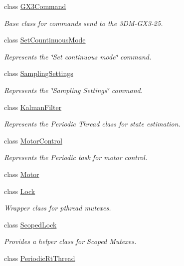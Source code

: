 \begin{DoxyCompactItemize}
class \hyperlink{class_u_s_u_1_1_g_x3_command}{\-G\-X3\-Command}
\begin{DoxyCompactList}\small\item\em \-Base class for commands send to the 3\-D\-M-\/\-G\-X3-\/25. \end{DoxyCompactList}\item 
class \hyperlink{class_u_s_u_1_1_set_countinuous_mode}{\-Set\-Countinuous\-Mode}
\begin{DoxyCompactList}\small\item\em \-Represents the \char`\"{}\-Set continuous mode\char`\"{} command. \end{DoxyCompactList}\item 
class \hyperlink{class_u_s_u_1_1_sampling_settings}{\-Sampling\-Settings}
\begin{DoxyCompactList}\small\item\em \-Represents the \char`\"{}\-Sampling Settings\char`\"{} command. \end{DoxyCompactList}\item 
class \hyperlink{class_u_s_u_1_1_kalman_filter}{\-Kalman\-Filter}
\begin{DoxyCompactList}\small\item\em \-Represents the \-Periodic \-Thread class for state estimation. \end{DoxyCompactList}\item 
class \hyperlink{class_u_s_u_1_1_motor_control}{\-Motor\-Control}
\begin{DoxyCompactList}\small\item\em \-Represents the \-Periodic task for motor control. \end{DoxyCompactList}\item 
class \hyperlink{class_u_s_u_1_1_motor}{\-Motor}
\item 
class \hyperlink{class_u_s_u_1_1_lock}{\-Lock}
\begin{DoxyCompactList}\small\item\em \-Wrapper class for pthread mutexes. \end{DoxyCompactList}\item 
class \hyperlink{class_u_s_u_1_1_scoped_lock}{\-Scoped\-Lock}
\begin{DoxyCompactList}\small\item\em \-Provides a helper class for \-Scoped \-Mutexes. \end{DoxyCompactList}\item 
class \hyperlink{class_u_s_u_1_1_periodic_rt_thread}{\-Periodic\-Rt\-Thread}

\end{DoxyCompactItemize}
